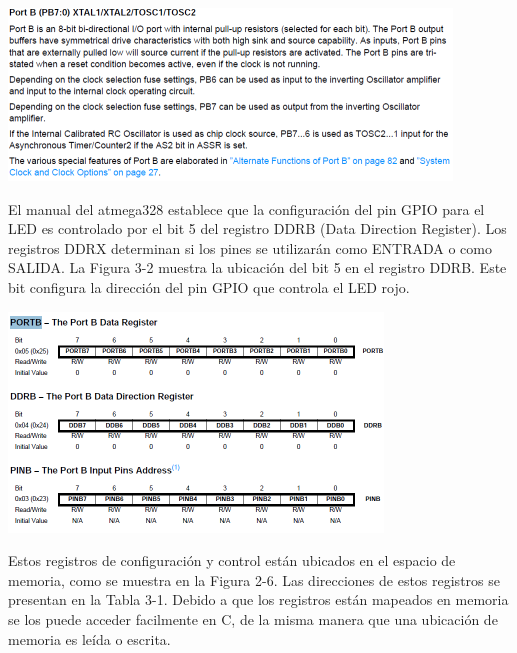 \documentclass[12pt]{article}
\begin{document}
\begin{center}
\includegraphics{descripcion-registro.png}
\end{center}



El manual del atmega328 establece que la configuración del pin GPIO para el
LED es controlado por el bit 5 del registro DDRB (Data Direction Register).
Los registros DDRX determinan si los pines se utilizarán como ENTRADA
o como SALIDA.
La Figura 3-2 muestra la ubicación del bit 5 en el registro DDRB. Este
bit configura la dirección del pin GPIO que controla el LED rojo.

\begin{center}
\includegraphics{portb-ddrb.png}
\end{center}

Estos registros de configuración y control están ubicados en el espacio de memoria, como se muestra en la Figura 2-6.
Las direcciones de estos registros se presentan en la Tabla 3-1. 
Debido a que los registros están mapeados en memoria se los puede
acceder facilmente en C, de la misma manera que una ubicación de memoria
es leída o escrita.

\end{document}
